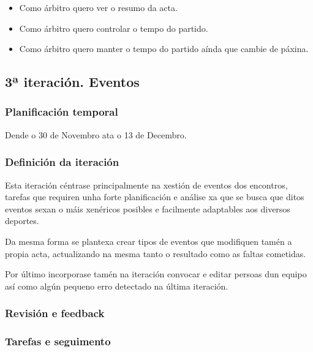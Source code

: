         \begin{itemize}
         \item Como árbitro quero ver o resumo da acta.
         \item Como árbitro quero controlar o tempo do partido.
         \item Como árbitro quero manter o tempo do partido aínda que cambie de 
páxina.
        \end{itemize}


    \subsection{3ª iteración. Eventos}

      \subsubsection{Planificación temporal}
      Dende o 30 de Novembro ata o 13 de Decembro.

      \subsubsection{Definición da iteración}
      Esta iteración céntrase principalmente na xestión de eventos dos 
encontros, tarefas que requiren unha forte planificación e análise xa que se 
busca que ditos eventos sexan o máis xenéricos posibles e facilmente adaptables 
aos diversos deportes.

      Da mesma forma se plantexa crear tipos de eventos que modifiquen tamén a 
propia acta, actualizando na mesma tanto o resultado como as faltas cometidas.

      Por último incorporase tamén na iteración convocar e editar persoas dun 
equipo así como algún pequeno erro detectado na última iteración.

      \subsubsection{Revisión e feedback}

      \subsubsection{Tarefas e seguimento}

